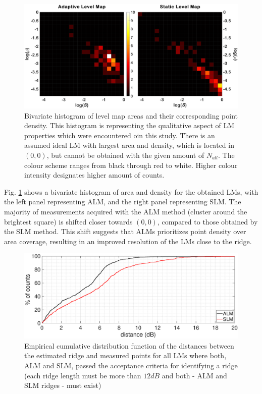 \documentclass[journal,twoside,web]{ieeecolor2}
\begin{document}
\begin{figure}
\centering
\includegraphics[width=.8\textwidth]{Fig_8_Coverage_sameClim.eps} %
\caption{Bivariate histogram of level map areas and their corresponding point density.
This histogram is representing the qualitative aspect of LM properties which were encountered oin this study.
There is an assumed ideal LM with largest area and density, which is located in $(0, 0)$, but cannot be obtained with the given amount of $N_{all}$.
The colour scheme ranges from black through red to white.
Higher colour intensity designates higher amount of counts.}
\label{fig_TGT}
\end{figure}

Fig. \ref{fig_TGT} shows a bivariate histogram of area and density for the obtained LMs, with the left panel representing ALM, and the right panel representing SLM.
The majority of measurements acquired with the ALM method (cluster around the brightest square) is shifted closer towards $(0, 0)$, compared to those obtained by the SLM method.
This shift suggests that ALMs prioritizes point density over area coverage, resulting in an improved resolution of the LMs close to the ridge.


\begin{figure}[ht]
\centerline{\includegraphics[width=\columnwidth]{Fig_9_Cumula.eps}}
\caption{Empirical cumulative distribution function of the distances between the estimated ridge and measured points for all LMs where both, ALM and SLM, passed the acceptance criteria for identifying a ridge (each ridge length must be more than $12dB$ and both - ALM and SLM ridges - must exist)}
\label{fig_CDF}
\end{figure}
\end{document}
